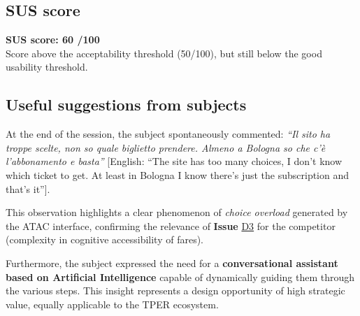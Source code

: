 ﻿\documentclass[11pt,a4paper]{article}
\begin{document}
\subsection*{SUS score}
\begin{tcolorbox}[base]
\textbf{SUS score: 60 /100}\\[0.2cm]
\small Score above the acceptability threshold
(50/100), but still below the good usability threshold.
\end{tcolorbox}

\subsection*{Useful suggestions from subjects}
\begin{tcolorbox}[base]
At the end of the session, the subject spontaneously commented: \textit{``Il sito ha troppe scelte, non so quale biglietto prendere. Almeno a Bologna so che c'\`e l'abbonamento e basta''} [English: ``The site has too many choices, I don't know which ticket to get. At least in Bologna I know there's just the subscription and that's it''].

This observation highlights a clear phenomenon of \textit{choice overload} generated by the ATAC interface, confirming the relevance of \textbf{Issue} \hyperref[atac:D3]{D3} for the competitor (complexity in cognitive accessibility of fares).

Furthermore, the subject expressed the need for a \textbf{conversational assistant based on Artificial Intelligence} capable of dynamically guiding them through the various steps. This insight represents a design opportunity of high strategic value, equally applicable to the TPER ecosystem.
\end{tcolorbox}
\end{document}
